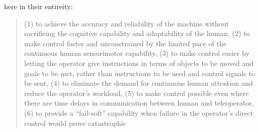 here in their entireity:
\begin{quote} (1) to achieve the accuracy and reliability of the
  machine without sacrificing the cognitive capability and
  adaptability of the human,
(2) to make control faster and unconstrained by the limited pace of
  the continuous human sensorimotor capability,
(3) to make control easier by letting the operator give instructions
  in terms of objects to be moved and goals to be met, rather than
  instructions to be used and control signals to be sent,
(4) to eliminate the demand for continuous human attention and reduce
  the operator's workload,
(5) to make control possible even where there are time delays in
  communication between human and teleoperator,
(6) to provide a ``fail-soft'' capability when failure in the
  operator's direct control would prove catastrophic\cite[p. 12]{sheridan}
\end{quote}

